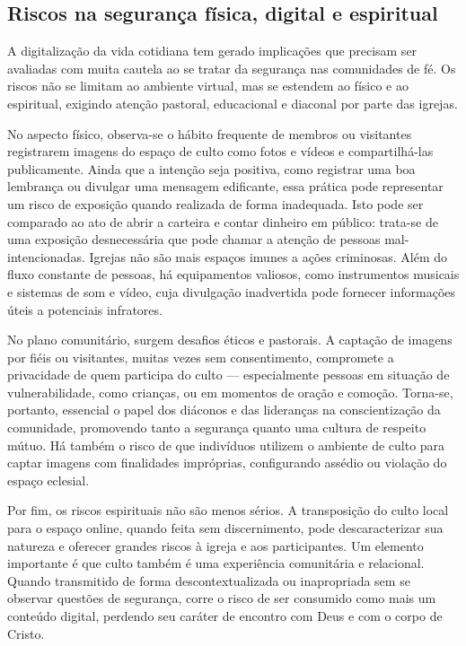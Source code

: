 \subsection{Riscos na segurança física, digital e espiritual}

A digitalização da vida cotidiana tem gerado implicações que precisam ser avaliadas com muita cautela ao se tratar da segurança nas comunidades de fé. Os riscos não se limitam ao ambiente virtual, mas se estendem ao físico e ao espiritual, exigindo atenção pastoral, educacional e diaconal por parte das igrejas.

No aspecto físico, observa-se o hábito frequente de membros ou visitantes registrarem imagens do espaço de culto como fotos e vídeos e compartilhá-las publicamente. Ainda que a intenção seja positiva, como registrar uma boa lembrança ou divulgar uma mensagem edificante, essa prática pode representar um risco de exposição quando realizada de forma inadequada. Isto pode ser comparado ao ato de abrir a carteira e contar dinheiro em público: trata-se de uma exposição desnecessária que pode chamar a atenção de pessoas mal-intencionadas. Igrejas não são mais espaços imunes a ações criminosas. Além do fluxo constante de pessoas, há equipamentos valiosos, como instrumentos musicais e sistemas de som e vídeo, cuja divulgação inadvertida pode fornecer informações úteis a potenciais infratores.

No plano comunitário, surgem desafios éticos e pastorais. A captação de imagens por fiéis ou visitantes, muitas vezes sem consentimento, compromete a privacidade de quem participa do culto — especialmente pessoas em situação de vulnerabilidade, como crianças, ou em momentos de oração e comoção. Torna-se, portanto, essencial o papel dos diáconos e das lideranças na conscientização da comunidade, promovendo tanto a segurança quanto uma cultura de respeito mútuo. Há também o risco de que indivíduos utilizem o ambiente de culto para captar imagens com finalidades impróprias, configurando assédio ou violação do espaço eclesial.

Por fim, os riscos espirituais não são menos sérios. A transposição do culto local para o espaço online, quando feita sem discernimento, pode descaracterizar sua natureza e oferecer grandes riscos à igreja e aos participantes. Um elemento importante é que culto também é uma experiência comunitária e relacional. Quando transmitido de forma descontextualizada ou inapropriada sem se observar questões de segurança, corre o risco de ser consumido como mais um conteúdo digital, perdendo seu caráter de encontro com Deus e com o corpo de Cristo.

